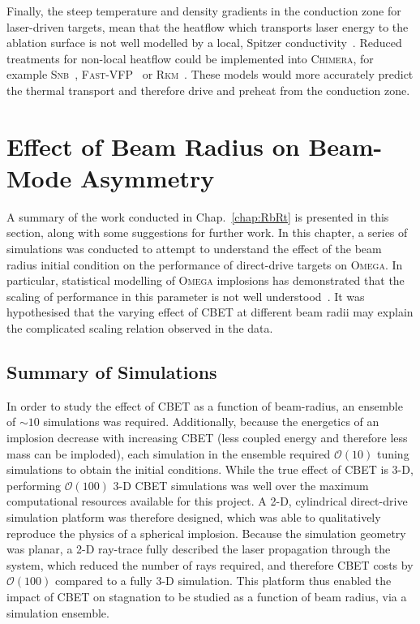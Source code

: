 Finally, the steep temperature and density gradients in the conduction zone for laser-driven targets, mean that the heatflow which transports laser energy to the ablation surface is not well modelled by a local, Spitzer conductivity~\cite{yuan_spacetime_2024}.
Reduced treatments for non-local heatflow could be implemented into \textsc{Chimera}, for example \textsc{Snb}~\cite{schurtz_nonlocal_2000,nicolai_practical_2006,cao_improved_2015}, \textsc{Fast-VFP}~\cite{bell_fast_2024} or \textsc{Rkm}~\cite{mitchell_reduced_2024}.
These models would more accurately predict the thermal transport and therefore drive and preheat from the conduction zone.

\section{Effect of Beam Radius on Beam-Mode Asymmetry}

A summary of the work conducted in Chap.~\ref{chap:RbRt} is presented in this section, along with some suggestions for further work.
In this chapter, a series of simulations was conducted to attempt to understand the effect of the beam radius initial condition on the performance of direct-drive targets on \textsc{Omega}.
In particular, statistical modelling of \textsc{Omega} implosions has demonstrated that the scaling of performance in this parameter is not well understood~\cite{lees_experimentally_2021,lees_understanding_2023}.
It was hypothesised that the varying effect of \ac{CBET} at different beam radii may explain the complicated scaling relation observed in the data.

\subsection{Summary of Simulations}

In order to study the effect of \ac{CBET} as a function of beam-radius, an ensemble of $\sim10$ simulations was required.
Additionally, because the energetics of an implosion decrease with increasing \ac{CBET} (less coupled energy and therefore less mass can be imploded), each simulation in the ensemble required $\mathcal{O}(10)$ tuning simulations to obtain the initial conditions.
While the true effect of \ac{CBET} is 3-D, performing $\mathcal{O}(100)$ 3-D \ac{CBET} simulations was well over the maximum computational resources available for this project.
A 2-D, cylindrical direct-drive simulation platform was therefore designed, which was able to qualitatively reproduce the physics of a spherical implosion.
Because the simulation geometry was planar, a 2-D ray-trace fully described the laser propagation through the system, which reduced the number of rays required, and therefore \ac{CBET} costs by $\mathcal{O}(100)$ compared to a fully 3-D simulation.
This platform thus enabled the impact of \ac{CBET} on stagnation to be studied as a function of beam radius, via a simulation ensemble.


